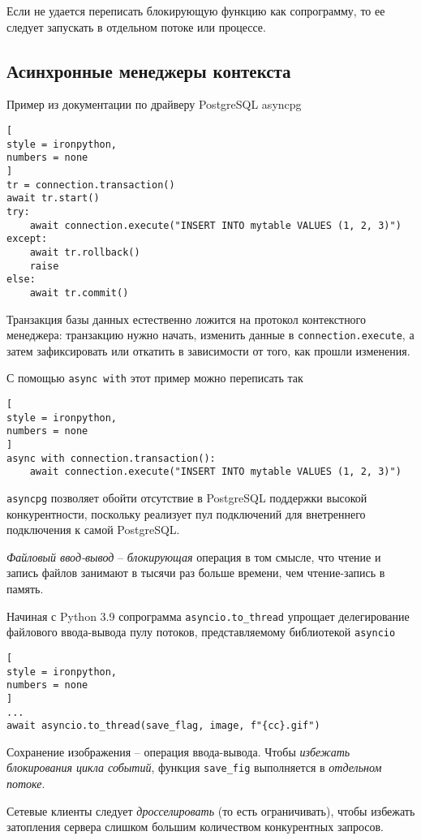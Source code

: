 \documentclass[%
	11pt,
	a4paper,
	utf8,
		]{article}
\begin{document}
Если не удается переписать блокирующую функцию как сопрограмму, то ее следует запускать в отдельном потоке или процессе.

\subsection{Асинхронные менеджеры контекста}

Пример из документации по драйверу PostgreSQL asyncpg
\begin{lstlisting}[
style = ironpython,
numbers = none
]
tr = connection.transaction()
await tr.start()
try:
    await connection.execute("INSERT INTO mytable VALUES (1, 2, 3)")
except:
    await tr.rollback()
    raise
else:
    await tr.commit()
\end{lstlisting}

Транзакция базы данных естественно ложится на протокол контекстного менеджера: транзакцию нужно начать, изменить данные в \verb|connection.execute|, а затем зафиксировать или откатить в зависимости от того, как прошли изменения.

С помощью \verb*|async with| этот пример можно переписать так
\begin{lstlisting}[
style = ironpython,
numbers = none
]
async with connection.transaction():
    await connection.execute("INSERT INTO mytable VALUES (1, 2, 3)")
\end{lstlisting}

\verb|asyncpg| позволяет обойти отсутствие в PostgreSQL поддержки высокой конкурентности, поскольку реализует пул подключений для внетреннего подключения к самой PostgreSQL.

\emph{Файловый ввод-вывод} -- \emph{блокирующая} операция в том смысле, что чтение и запись файлов занимают в тысячи раз больше времени, чем чтение-запись в память. 

Начиная с Python 3.9 сопрограмма \verb*|asyncio.to_thread| упрощает делегирование файлового ввода-вывода пулу потоков, представляемому библиотекой \verb|asyncio|
\begin{lstlisting}[
style = ironpython,
numbers = none
]
...
await asyncio.to_thread(save_flag, image, f"{cc}.gif")
\end{lstlisting}

Сохранение изображения -- операция ввода-вывода. Чтобы \emph{избежать блокирования цикла событий}, функция \verb*|save_fig| выполняется в \emph{отдельном потоке}.

Сетевые клиенты следует \emph{дросселировать} (то есть ограничивать), чтобы избежать затопления сервера слишком большим количеством конкурентных запросов. 
\end{document}
